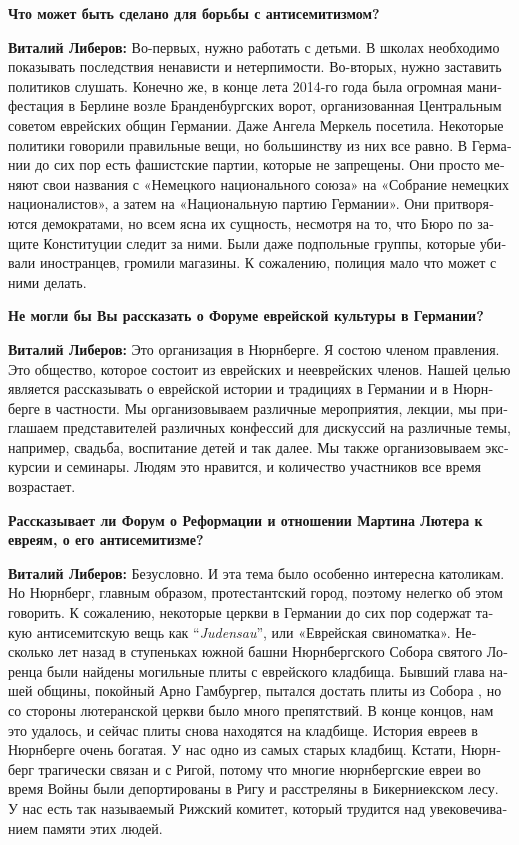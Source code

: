 \begin{otherlanguage}{russian}
	\textbf{Что может быть сделано для борьбы с антисемитизмом?} 
	
	\textbf{Виталий Либеров:} Во-первых, нужно работать с детьми. В школах необходимо показывать последствия ненависти и нетерпимости. Во-вторых, нужно заставить политиков слушать. Конечно же, в конце лета 2014-го года была огромная манифестация в Берлине возле Бранденбургских ворот, организованная Центральным советом еврейских общин Германии. Даже Ангела Меркель посетила. Некоторые политики говорили правильные вещи, но большинству из них все равно. В Германии до сих пор есть фашистские партии, которые не запрещены. Они просто меняют свои названия с «Немецкого национального союза» на «Собрание немецких националистов», а затем на «Национальную партию Германии». Они притворяются демократами, но всем ясна их сущность, несмотря на то, что Бюро по защите Конституции следит за ними. Были даже подпольные группы, которые убивали иностранцев, громили магазины. К сожалению, полиция мало что может с ними делать. 
	
	\textbf{Не могли бы Вы рассказать о Форуме еврейской культуры в Германии?} 
	
	\textbf{Виталий Либеров:} Это организация в Нюрнберге. Я состою членом правления. Это общество, которое состоит из еврейских и нееврейских членов. Нашей целью является рассказывать о еврейской истории и традициях в Германии и в Нюрнберге в частности. Мы организовываем различные мероприятия, лекции, мы приглашаем представителей различных конфессий для дискуссий на различные темы, например, свадьба, воспитание детей и так далее. Мы также организовываем экскурсии и семинары. Людям это нравится, и количество участников все время возрастает. 
	
	\textbf{Рассказывает ли Форум о Реформации и отношении Мартина Лютера к евреям, о его антисемитизме?} 
	
	\textbf{Виталий Либеров:} Безусловно. И эта тема было особенно интересна католикам. Но Нюрнберг, главным образом, протестантский город, поэтому нелегко об этом говорить. К сожалению, некоторые церкви в Германии до сих пор содержат такую антисемитскую вещь как ``\textit{Judensau}'', или «Еврейская свиноматка». Несколько лет назад в ступеньках южной башни Нюрнбергского Собора святого Лоренца были найдены могильные плиты с еврейского кладбища. Бывший глава нашей общины, покойный Арно Гамбургер, пытался достать плиты из Собора , но со стороны лютеранской церкви было много препятствий. В конце концов, нам это удалось, и сейчас плиты снова находятся на кладбище. История евреев в Нюрнберге очень богатая. У нас одно из самых старых кладбищ. Кстати, Нюрнберг трагически связан и с Ригой, потому что многие нюрнбергские евреи во время Войны были депортированы в Ригу и расстреляны в Бикерниекском лесу. У нас есть так называемый Рижский комитет, который трудится над увековечиванием памяти этих людей.    
\end{otherlanguage} 
\newpage
